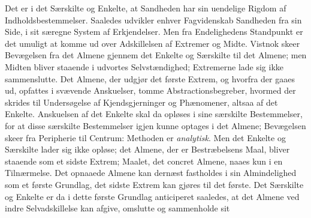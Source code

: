 \documentclass[12pt]{book}
\begin{document}
Det er i det Særskilte og Enkelte, at Sandheden har sin uendelige Rigdom af Indholdsbestemmelser. Saaledes udvikler enhver Fagvidenskab Sandheden fra sin Side, i sit særegne System af Erkjendelser. Men fra Endelighedens Standpunkt er det umuligt at komme ud over Adskillelsen af Extremer og Midte. Vistnok skeer Bevægelsen fra det Almene gjennem det Enkelte og Særskilte til det Almene; men Midten bliver staaende i udvortes Selvstændighed; Extremerne lade sig ikke sammenslutte. Det Almene, der udgjør det første Extrem, og hvorfra der gaaes ud, opfattes i svævende Anskuelser, tomme Abstractionsbegreber, hvormed der skrides til Undersøgelse af Kjendsgjerninger og Phænomener, altsaa af det Enkelte. Anskuelsen af det Enkelte skal da opløses i sine særskilte Bestemmelser, for at disse særskilte Bestemmelser igjen kunne optages i det Almene; Bevægelsen skeer fra Peripherie til Centrum: Methoden er \emph{analytisk}. Men det Enkelte og Særskilte lader sig ikke opløse; det Almene, der er Bestræbelsens Maal, bliver staaende som et sidste Extrem; Maalet, det concret Almene, naaes kun i en Tilnærmelse. Det opnaaede Almene kan dernæst fastholdes i sin Almindelighed som et første Grundlag, det sidste Extrem kan gjøres til det første. Det Særskilte og Enkelte er da i dette første Grundlag anticiperet saaledes, at det Almene ved indre Selvadskillelse kan afgive, omslutte og sammenholde sit
\end{document}
